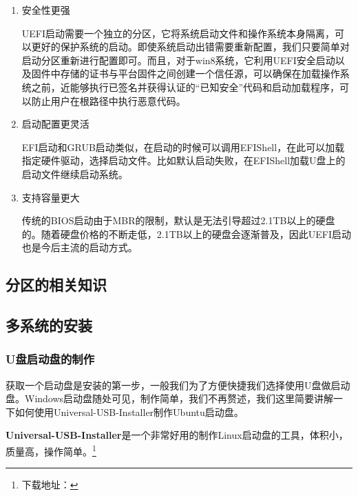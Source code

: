 \begin{enumerate}
	\item 安全性更强
	
	UEFI启动需要一个独立的分区，它将系统启动文件和操作系统本身隔离，可以更好的保护系统的启动。即使系统启动出错需要重新配置，我们只要简单对启动分区重新进行配置即可。而且，对于win8系统，它利用UEFI安全启动以及固件中存储的证书与平台固件之间创建一个信任源，可以确保在加载操作系统之前，近能够执行已签名并获得认证的“已知安全”代码和启动加载程序，可以防止用户在根路径中执行恶意代码。
	
	\item 启动配置更灵活
	
	EFI启动和GRUB启动类似，在启动的时候可以调用EFIShell，在此可以加载指定硬件驱动，选择启动文件。比如默认启动失败，在EFIShell加载U盘上的启动文件继续启动系统。
	
	\item 支持容量更大
	
	传统的BIOS启动由于MBR的限制，默认是无法引导超过2.1TB以上的硬盘的。随着硬盘价格的不断走低，2.1TB以上的硬盘会逐渐普及，因此UEFI启动也是今后主流的启动方式。
\end{enumerate}

\subsection{分区的相关知识}

\subsection{多系统的安装}

\subsubsection{U盘启动盘的制作}

获取一个启动盘是安装的第一步，一般我们为了方便快捷我们选择使用U盘做启动盘。Windows启动盘随处可见，制作简单，我们不再赘述，我们这里简要讲解一下如何使用Universal-USB-Installer制作Ubuntu启动盘。

\textbf{Universal-USB-Installer}是一个非常好用的制作Linux启动盘的工具，体积小，质量高，操作简单。\footnote{下载地址：}

